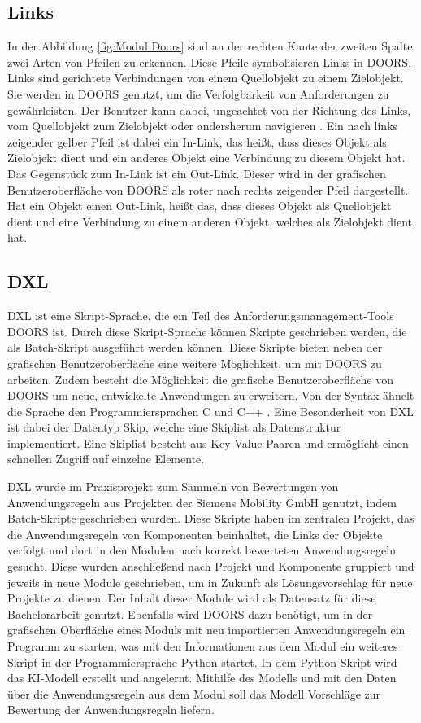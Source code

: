 \subsection{Links}
In der Abbildung \ref*{fig:Modul Doors} sind an der rechten Kante der zweiten Spalte zwei Arten von Pfeilen zu erkennen. Diese Pfeile
symbolisieren Links in \ac{DOORS}. Links sind gerichtete Verbindungen von einem Quellobjekt zu einem Zielobjekt. Sie werden in \ac{DOORS} 
genutzt, um die Verfolgbarkeit von Anforderungen zu gewährleisten. Der Benutzer kann 
dabei, ungeachtet von der Richtung des Links, vom Quellobjekt zum Zielobjekt oder andersherum navigieren \cite[vgl. S.183]{DOORS}. 
Ein nach links zeigender gelber Pfeil ist dabei ein In-Link, das heißt, dass dieses Objekt als Zielobjekt dient und ein anderes Objekt 
eine Verbindung zu diesem Objekt hat. Das Gegenstück zum In-Link ist ein Out-Link. Dieser wird in der grafischen Benutzeroberfläche von 
\ac{DOORS} als roter nach rechts zeigender Pfeil dargestellt. Hat ein Objekt einen Out-Link, heißt das, dass dieses Objekt als Quellobjekt 
dient und eine Verbindung zu einem anderen Objekt, welches als Zielobjekt dient, hat.   

\subsection{DXL}

\ac{DXL} ist eine Skript-Sprache, die ein Teil des Anforderungsmanagement-Tools \ac{DOORS} ist. Durch diese Skript-Sprache
können Skripte geschrieben werden, die als Batch-Skript ausgeführt werden können. Diese Skripte bieten neben der grafischen Benutzeroberfläche eine weitere Möglichkeit, 
um mit \ac{DOORS} zu arbeiten. Zudem besteht die Möglichkeit die grafische Benutzeroberfläche von \ac{DOORS} um neue, entwickelte Anwendungen zu
erweitern. Von der Syntax ähnelt die Sprache den Programmiersprachen C und C++ \cite[vgl. S.1]{DXL}. Eine Besonderheit von \ac{DXL} ist dabei der Datentyp Skip, 
welche eine Skiplist als Datenstruktur implementiert. Eine Skiplist besteht aus Key-Value-Paaren und ermöglicht einen schnellen Zugriff auf einzelne Elemente.

\ac{DXL} wurde im Praxisprojekt zum Sammeln von Bewertungen von Anwendungsregeln aus Projekten der Siemens Mobility GmbH 
genutzt, indem Batch-Skripte geschrieben wurden. Diese Skripte haben im zentralen Projekt, das die Anwendungsregeln von Komponenten beinhaltet, die Links der Objekte
verfolgt und dort in den Modulen nach korrekt bewerteten Anwendungsregeln gesucht. Diese wurden anschließend nach Projekt und Komponente gruppiert und 
jeweils in neue Module geschrieben, um in Zukunft als Lösungsvorschlag für neue Projekte zu dienen. Der Inhalt dieser Module wird als Datensatz für diese Bachelorarbeit genutzt.
Ebenfalls wird \ac{DOORS} dazu benötigt, um in der grafischen Oberfläche eines Moduls mit neu importierten Anwendungsregeln ein Programm zu starten, was mit den Informationen aus dem Modul
ein weiteres Skript in der Programmiersprache Python startet. In dem Python-Skript wird das KI-Modell erstellt und angelernt. Mithilfe des Modells und mit den Daten über die Anwendungsregeln aus 
dem Modul soll das Modell Vorschläge zur Bewertung der Anwendungsregeln liefern.


